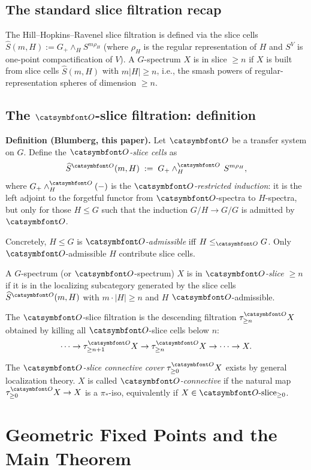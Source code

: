 \subsection*{The standard slice filtration recap}

The Hill--Hopkins--Ravenel slice filtration is defined via the slice cells $\widehat S(m,H):=G_+\wedge_H S^{m\rho_H}$ (where $\rho_H$ is the regular representation of $H$ and $S^V$ is one-point compactification of $V$).  A $G$-spectrum $X$ is in slice $\geq n$ if $X$ is built from slice cells $\widehat S(m,H)$ with $m|H|\geq n$, i.e., the smash powers of regular-representation spheres of dimension $\geq n$.

\subsection*{The $\aO$-slice filtration: definition}

\noindent\textbf{Definition (Blumberg, this paper).}  Let $\aO$ be a transfer system on $G$.  Define the \emph{$\aO$-slice cells} as
\[
\widehat S^\aO(m,H) \;:=\; G_+\wedge_H^{\aO}\, S^{m\rho_H},
\]
where $G_+\wedge_H^\aO(-)$ is the \emph{$\aO$-restricted induction}: it is the left adjoint to the forgetful functor from $\aO$-spectra to $H$-spectra, but only for those $H\le G$ such that the induction $G/H\to G/G$ is admitted by $\aO$.

Concretely, $H\le G$ is \emph{$\aO$-admissible} iff $H\le_\aO G$.  Only $\aO$-admissible $H$ contribute slice cells.

\medskip
A $G$-spectrum (or $\aO$-spectrum) $X$ is in \emph{$\aO$-slice $\geq n$} if it is in the localizing subcategory generated by the slice cells $\widehat S^\aO(m,H)$ with $m\cdot|H|\geq n$ and $H$ $\aO$-admissible.

\medskip
The $\aO$-slice filtration is the descending filtration $\tau^\aO_{\geq n}X$ obtained by killing all $\aO$-slice cells below $n$:
\[
\cdots\to\tau^\aO_{\geq n+1}X\to\tau^\aO_{\geq n}X\to\cdots\to X.
\]

The \emph{$\aO$-slice connective cover} $\tau^\aO_{\geq 0}X$ exists by general localization theory.  $X$ is called \emph{$\aO$-connective} if the natural map $\tau^\aO_{\geq 0}X\to X$ is a $\pi_*$-iso, equivalently if $X\in\aO\text{-slice}_{\geq 0}$.

\section*{Geometric Fixed Points and the Main Theorem}


